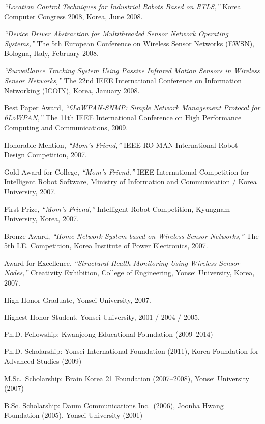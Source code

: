 \documentclass[12pt,letterpaper]{article}
\newenvironment{itemize*}%
{\begin{itemize}%
  \setlength{\itemsep}{0pt}}%
{\end{itemize}}
\def\myvspace{\vspace{-0.22in}}
\newcommand{\mhead}[1]{\leavevmode\marginpar{\sffamily\footnotesize #1}}
\begin{document}
\bigskip
\emph{``Location Control Techniques for Industrial Robots Based on RTLS,''} Korea Computer Congress 2008, Korea, June 2008.

\bigskip
\emph{``Device Driver Abstraction for Multithreaded Sensor Network Operating Systems,''} The 5th European Conference on Wireless Sensor Networks (EWSN), Bologna, Italy, February 2008.

\bigskip
\emph{``Surveillance Tracking System Using Passive Infrared Motion Sensors in Wireless Sensor Networks,''} The 22nd IEEE International Conference on Information Networking (ICOIN), Korea, January 2008.

\bigskip
\mhead{Awards}%
Best Paper Award, \emph{``6LoWPAN-SNMP: Simple Network Management Protocol for 6LoWPAN,''} The 11th IEEE International Conference on High Performance Computing and Communications, 2009.

\bigskip
Honorable Mention, \emph{``Mom’s Friend,''} IEEE RO-MAN International Robot Design Competition, 2007.

\bigskip
Gold Award for College, \emph{``Mom’s Friend,''} IEEE International Competition for Intelligent Robot Software, Ministry of Information and Communication / Korea University, 2007. 

\bigskip
First Prize, \emph{``Mom’s Friend,''} Intelligent Robot Competition, Kyungnam University, Korea, 2007.

\bigskip
Bronze Award, \emph{``Home Network System based on Wireless Sensor Networks,''} The 5th I.E. Competition, Korea Institute of Power Electronics, 2007.

\bigskip
Award for Excellence, \emph{``Structural Health Monitoring Using Wireless Sensor Nodes,''} Creativity Exhibition, College of Engineering, Yonsei University, Korea, 2007.

\bigskip
\mhead{Honors}%
High Honor Graduate, Yonsei University, 2007.

\medskip
Highest Honor Student, Yonsei University, 2001 / 2004 / 2005.

\bigskip
\mhead{Fellowships/ Scholarships}%
\myvspace
\begin{itemize*}
  \item Ph.D. Fellowship: Kwanjeong Educational Foundation (2009--2014)
  \item Ph.D. Scholarship: Yonsei International Foundation (2011), Korea Foundation for Advanced Studies (2009)
  \item M.Sc.~Scholarship: Brain Korea 21 Foundation (2007--2008), Yonsei University (2007)
  \item B.Sc. Scholarship: Daum Communications Inc.~(2006), Joonha Hwang Foundation (2005), Yonsei University (2001)
\end{itemize*}
\end{document}

